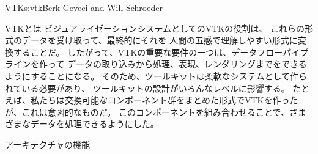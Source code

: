 \begin{aosachapter}{VTK}{s:vtk}{Berk Geveci and Will Schroeder}
\begin{aosasect1}{VTKとは}
ビジュアライゼーションシステムとしてのVTKの役割は、
これらの形式のデータを受け取って、最終的にそれを
人間の五感で理解しやすい形式に変換することだ。
したがって、VTKの重要な要件の一つは、データフローパイプラインを作って
データの取り込みから処理、表現、レンダリングまでをできるようにすることになる。
そのため、ツールキットは柔軟なシステムとして作られている必要があり、
ツールキットの設計がいろんなレベルに影響する。
たとえば、私たちは交換可能なコンポーネント群をまとめた形式でVTKを作ったが、これは意図的なものだ。
このコンポーネントを組み合わせることで、さまざまなデータを処理できるようにした。

\end{aosasect1}

\begin{aosasect1}{アーキテクチャの機能}


\end{aosasect1}
\end{aosachapter}
